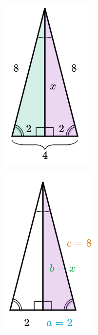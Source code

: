 \begin{solutionbox}{15cm}
    \begin{minipage}{0.3\textwidth}
        \begin{figure}[H]
            \centering
            \includegraphics[width=0.5\linewidth]{../images/pitagoras1a.png}
            \caption{}
            \label{fig:pitagoras1a}
        \end{figure}
        \begin{figure}[H]
            \centering
            \includegraphics[width=0.5\linewidth]{../images/pitagoras1b.png}

\end{figure}
\end{minipage}
\end{solutionbox}
